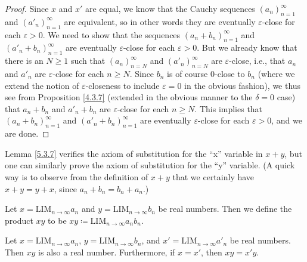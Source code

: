 \begin{proof}
Since \(x\) and \(x'\) are equal, we know that the Cauchy sequences \((a_n)_{n = 1}^{\infty}\) and \((a'_n)_{n = 1}^{\infty}\) are equivalent, so in other words they are eventually \(\varepsilon\)-close for each \(\varepsilon > 0\).
We need to show that the sequences \((a_n + b_n)_{n = 1}^{\infty}\) and \((a'_n + b_n)_{n = 1}^{\infty}\) are eventually \(\varepsilon\)-close for each \(\varepsilon > 0\).
But we already know that there is an \(N \geq 1\) such that \((a_n)_{n = N}^{\infty}\) and \((a'_n)_{n = N}^{\infty}\) are \(\varepsilon\)-close, i.e., that \(a_n\) and \(a'_n\) are \(\varepsilon\)-close for each \(n \geq N\).
Since \(b_n\) is of course \(0\)-close to \(b_n\) (where we extend the notion of \(\varepsilon\)-closeness to include \(\varepsilon = 0\) in the obvious fashion), we thus see from Proposition \ref{4.3.7} (extended in the obvious manner to the \(\delta = 0\) case) that \(a_n + b_n\) and \(a'_n + b_n\) are \(\varepsilon\)-close for each \(n \geq N\).
This implies that \((a_n + b_n)_{n = 1}^{\infty}\) and \((a'_n + b_n)_{n = 1}^{\infty}\) are eventually \(\varepsilon\)-close for each \(\varepsilon > 0\), and we are done.
\end{proof}

\begin{remark}\label{5.3.8}
Lemma \ref{5.3.7} verifies the axiom of substitution for the ``x'' variable in \(x + y\), but one can similarly prove the axiom of substitution for the ``y'' variable.
(A quick way is to observe from the definition of \(x + y\) that we certainly have \(x + y = y + x\), since \(a_n + b_n = b_n + a_n\).)
\end{remark}

\begin{definition}\label{5.3.9}
Let \(x = \text{LIM}_{n \to \infty} a_n\) and \(y = \text{LIM}_{n \to \infty} b_n\) be real numbers.
Then we define the product \(xy\) to be \(xy \coloneqq \text{LIM}_{n \to \infty} a_n b_n\).
\end{definition}

\begin{proposition}\label{5.3.10}
Let \(x = \text{LIM}_{n \to \infty} a_n\), \(y = \text{LIM}_{n \to \infty} b_n\), and \(x' = \text{LIM}_{n \to \infty} a'_n\) be real numbers.
Then \(xy\) is also a real number.
Furthermore, if \(x = x'\), then \(xy = x'y\).
\end{proposition}

